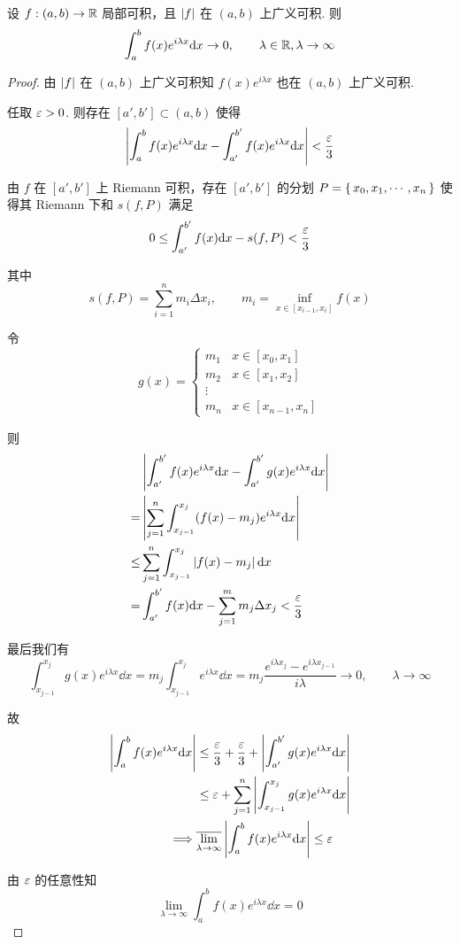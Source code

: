\begin{lemma}
    设 $f:(a,b)\to\mathbb{R}$ 局部可积，且 $\left\lvert{f}\right\rvert$ 在 $(a,b)$ 上广义可积. 则
$$
\int_a^b f(x)e^{i\lambda x}\mathrm{d} x\to 0,\qquad\lambda\in\mathbb{R},\lambda\to\infty
$$
\end{lemma}
\begin{proof}
    由 $\left\lvert{f}\right\rvert$ 在 $(a,b)$ 上广义可积知 $f(x)e^{i\lambda x}$ 也在 $(a,b)$ 上广义可积.

    任取 $\varepsilon>0$. 则存在 $[a',b']\subset(a,b)$ 使得
$$
\left\lvert{\int_a^b f(x)e^{i\lambda x}\mathrm{d}x-\int_{a'}^{b'}f(x)e^{i\lambda x}\mathrm{d}x}\right\rvert<\frac{\varepsilon}{3}
$$

    由 $f$ 在 $[a',b']$ 上 Riemann 可积，存在 $[a',b']$ 的分划 $P=\set{x_0,x_1,\cdots,x_n}$ 使得其 Riemann 下和 $s(f,P)$ 满足
$$
0\le\int_{a'}^{b'}f(x)\mathrm{d} x-s(f,P)<\frac{\varepsilon}{3}
$$

    其中
$$
s(f,P)=\sum_{i=1}^n m_i\Delta x_i,\qquad m_i=\inf_{x\in[x_{i-1},x_i]}f(x)
$$

    令
$$
g(x)=\begin{cases}
    m_1 & x\in[x_0,x_1]\\
    m_2 & x\in[x_1,x_2]\\
    \vdots\\
    m_n & x\in[x_{n-1},x_n]
\end{cases}
$$

    则
$$
\begin{aligned}
    &\left\lvert{\int_{a'}^{b'}f(x)e^{i\lambda x}\mathrm{d}x-\int_{a'}^{b'}g(x)e^{i\lambda x}\mathrm{d}x}\right\rvert\\
    =&\left\lvert{\sum_{j=1}^n\int_{x_{j-1}}^{x_j}(f(x)-m_j)e^{i\lambda x}\mathrm{d}x}\right\rvert\\
    \le&\sum_{j=1}^n\int_{x_{j-1}}^{x_j}\left\lvert{f(x)-m_j}\right\rvert\mathrm{d} x\\
    =&\int_{a'}^{b'}f(x)\mathrm{d} x-\sum_{j=1}^mm_j\Delta x_j<\frac{\varepsilon}{3}
\end{aligned}
$$

    最后我们有
$$
\int_{x_{j-1}}^{x_j}g(x)e^{i\lambda x}\dd x=m_j\int_{x_{j-1}}^{x_j}e^{i\lambda x}\dd x=m_j\frac{e^{i\lambda x_j}-e^{i\lambda x_{j-1}}}{i\lambda}\to 0,\qquad\lambda\to\infty
$$

    故
$$
\begin{aligned}
    \left\lvert{\int_a^bf(x)e^{i\lambda x}\mathrm{d}x}\right\rvert&\le\frac{\varepsilon}{3}+\frac{\varepsilon}{3}+\left\lvert{\int_{a'}^{b'}g(x)e^{i\lambda x}\mathrm{d}x}\right\rvert\\
    &\le\varepsilon+\sum_{j=1}^n\left\lvert{\int_{x_{j-1}}^{x_j}g(x)e^{i\lambda x}\mathrm{d}x}\right\rvert\\
    \implies&\overline{\lim_{\lambda\to\infty}}\left\lvert{\int_a^b f(x)e^{i\lambda x}\mathrm{d}x}\right\rvert\le\varepsilon
\end{aligned}
$$

    由 $\varepsilon$ 的任意性知
$$
\lim_{\lambda\to\infty}\int_a^bf(x)e^{i\lambda x}\dd x=0
$$
\end{proof}

